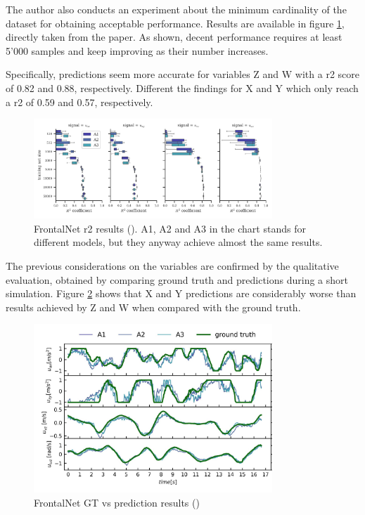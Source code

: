 The author also conducts an experiment about the minimum cardinality of the dataset for obtaining acceptable performance. Results are available in figure \ref{fig:frontalnet-r2}, directly taken from the paper. As shown, decent performance requires at least 5'000 samples and keep improving as their number increases.

Specifically, predictions seem more accurate for variables Z and W with a \gls{r2} score of 0.82 and 0.88, respectively. Different the findings for X and Y which only reach a \gls{r2} of 0.59 and 0.57, respectively.

\begin{figure}[!htb]
	\centering
	\includegraphics[width=0.8\textwidth]{"contents/images/03-frontalnet-r2"}
	\caption[FrontalNet \gls{r2} results (\cite{mantegazza2019visionbased})]{FrontalNet \gls{r2} results (\cite{mantegazza2019visionbased}). A1, A2 and A3 in the chart stands for different models, but they anyway achieve almost the same results.}
	\label{fig:frontalnet-r2}
\end{figure}

\medskip

The previous considerations on the variables are confirmed by the qualitative evaluation, obtained by comparing ground truth and predictions during a short simulation. Figure \ref{fig:frontalnet-gt-pred} shows that X and Y predictions are considerably worse than results achieved by Z and W when compared with the ground truth.

\begin{figure}[!htb]
	\centering
	\includegraphics[width=0.8\textwidth]{"contents/images/03-frontalnet-gt-pred-2"}
	\caption[FrontalNet GT vs prediction results (\cite{mantegazza2019visionbased})]{FrontalNet GT vs prediction results (\cite{mantegazza2019visionbased})}
	\label{fig:frontalnet-gt-pred}
\end{figure}



